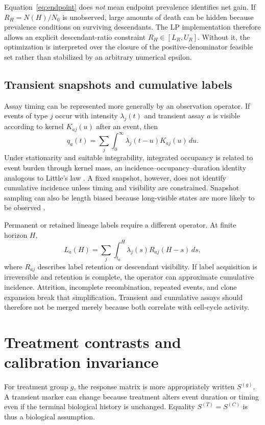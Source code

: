 \documentclass[11pt]{article}
\begin{document}
Equation~\eqref{eq:endpoint} does \emph{not} mean endpoint prevalence identifies net gain. If $R_H=N(H)/N_0$ is unobserved, large amounts of death can be hidden because prevalence conditions on surviving descendants. The LP implementation therefore allows an explicit descendant-ratio constraint $R_H\in[L_R,U_R]$. Without it, the optimization is interpreted over the closure of the positive-denominator feasible set rather than stabilized by an arbitrary numerical epsilon.

\subsection{Transient snapshots and cumulative labels}
Assay timing can be represented more generally by an observation operator. If events of type $j$ occur with intensity $\lambda_j(t)$ and transient assay $a$ is visible according to kernel $K_{aj}(u)$ after an event, then
\begin{equation}
q_a(t)=\sum_j\int_0^\infty \lambda_j(t-u)K_{aj}(u)\,du.
\label{eq:kernel}
\end{equation}
Under stationarity and suitable integrability, integrated occupancy is related to event burden through kernel mass, an incidence--occupancy--duration identity analogous to Little's law \citep{Little1961}. A fixed snapshot, however, does not identify cumulative incidence unless timing and visibility are constrained. Snapshot sampling can also be length biased because long-visible states are more likely to be observed \citep{Vardi1982}.

Permanent or retained lineage labels require a different operator. At finite horizon $H$,
\begin{equation}
L_a(H)=\sum_j\int_{t_0}^{H}\lambda_j(s)R_{aj}(H-s)\,ds,
\end{equation}
where $R_{aj}$ describes label retention or descendant visibility. If label acquisition is irreversible and retention is complete, the operator can approximate cumulative incidence. Attrition, incomplete recombination, repeated events, and clone expansion break that simplification. Transient and cumulative assays should therefore not be merged merely because both correlate with cell-cycle activity.

\section{Treatment contrasts and calibration invariance}
For treatment group $g$, the response matrix is more appropriately written $S^{(g)}$. A transient marker can change because treatment alters event duration or timing even if the terminal biological history is unchanged. Equality $S^{(T)}=S^{(C)}$ is thus a biological assumption.
\end{document}
